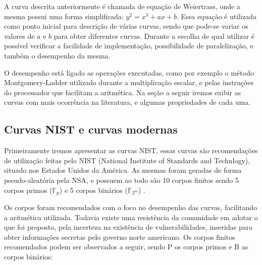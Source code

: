 A curva descrita anteriormente é chamada de equação de Weiertrass, onde a mesma possui uma forma simplificada: $y^2 = x^3 + ax + b$. Essa equação é utilizada como ponto inicial para descrição de várias curvas, sendo que pode-se variar os valores de $a$ e $b$ para obter diferentes curvas. Durante a escolha de qual utilizar é possível verificar a facilidade de implementação, possibilidade de paralelização, e também o desempenho da mesma. 

O desempenho está ligado as operações executadas, como por exemplo o método Montgomery-Ladder utilizado durante a multiplicação escalar, e pelas instruções do processador que facilitam a aritmética. Na seção a seguir iremos exibir as curvas com mais ocorrência na literatura, e algumas propriedades de cada uma.

\subsection{Curvas NIST e curvas modernas}
Primeiramente iremos apresentar as curvas NIST, essas curvas são recomendações de utilização feitas pelo NIST (National Institute of Standards and Technlogy), situado nos Estados Unidos da América. As mesmas foram geradas de forma pseudo-aleatória pela NSA, e possuem ao todo são 10 corpos finitos sendo 5 corpos primos ($\mathbb{F}_p$) e 5 corpos binários ($\mathbb{F}_{2^m}$) \cite{Brown2001}.

Os corpos foram recomendados com o foco no desempenho das curvas, facilitando a aritmética utilizada. Todavia existe uma resistência da comunidade em adotar o que foi proposto, pela incerteza na existência de vulnerabilidades, inseridas para obter informações secretas pelo governo norte americano. Os corpos finitos recomendados podem ser observados a seguir, sendo P os corpos primos e B as corpos binários:

